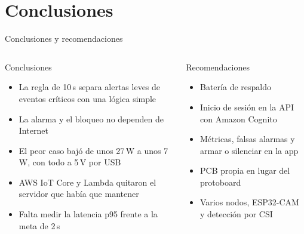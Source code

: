 \documentclass[aspectratio=169,10pt]{beamer}
\begin{document}
\section{Conclusiones}

\begin{frame}{Conclusiones y recomendaciones}
  \begin{columns}[T]
    \begin{block}{Conclusiones}
      \small
      \begin{itemize}
        \item La regla de 10\,s separa alertas leves de eventos críticos con una lógica simple
        \item La alarma y el bloqueo no dependen de Internet
        \item El peor caso bajó de unos 27\,W a unos 7\,W, con todo a 5\,V por USB
        \item AWS IoT Core y Lambda quitaron el servidor que había que mantener
        \item Falta medir la latencia p95 frente a la meta de 2\,s
      \end{itemize}
    \end{block}
    \begin{block}{Recomendaciones}
      \small
      \begin{itemize}
        \item Batería de respaldo
        \item Inicio de sesión en la API con Amazon Cognito
        \item Métricas, falsas alarmas y armar o silenciar en la app
        \item PCB propia en lugar del protoboard
        \item Varios nodos, ESP32-CAM y detección por CSI \cite{zhuang2021intrusion}
      \end{itemize}
    \end{block}
  \end{columns}
\end{frame}
\end{document}
